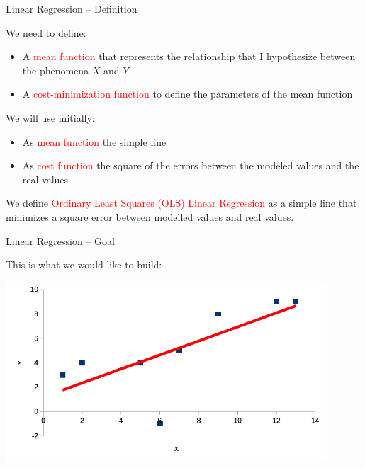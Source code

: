\documentclass{beamer}
\begin{document}
\begin{frame}
{\centerline{Linear Regression -- Definition}}
We need to define:
\begin{itemize}
\item A \textcolor{red}{mean function} that represents the relationship that I hypothesize between the phenomena $X$ and $Y$\\
\item A \textcolor{red}{cost-minimization function} to define the parameters of the mean function
\end{itemize}
We will use initially:
\begin{itemize}
\item As \textcolor{red}{mean function} the simple line\\
\item As \textcolor{red}{cost function} the square of the errors between the modeled values and the real values
\end{itemize}
We define \textcolor{red}{Ordinary Least Squares (OLS) Linear Regression} as a simple line that minimizes a square error between modelled values and real values.
\end{frame}

\begin{frame}
{\centerline{Linear Regression -- Goal}}

This is what we would like to build:

\begin{center}
\includegraphics[width=12cm]{P2023.AIBCCSS.FoundationsDataScience/LinearRegression_OLS.png}
\end{center}



\end{frame}
\end{document}
